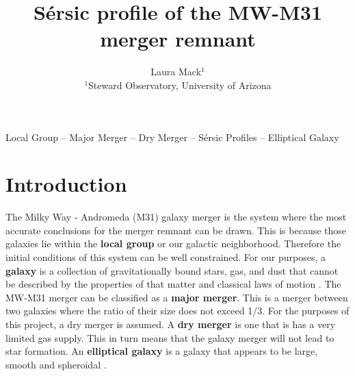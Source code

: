 \documentclass[fleqn,usenatbib]{mnras}
\title[S\'ersic profile of the MW-M31 merger remnant]{S\'ersic profile of the MW-M31 merger remnant}
\author[L. Mack]{
Laura Mack$^{1}$
\\
$^{1}$Steward Observatory, University of Arizona
}
\begin{document}
\label{firstpage}
\pagerange{\pageref{firstpage}--\pageref{lastpage}}
\maketitle


\begin{keywords}
Local Group -- Major Merger -- Dry Merger -- S\'ersic Profiles -- Elliptical Galaxy 
\end{keywords}



\section{Introduction}
The Milky Way - Andromeda (M31) galaxy merger is the system where the most accurate conclusions for the merger remnant can be drawn. This is because those galaxies lie within the \textbf{local group} or our galactic neighborhood. Therefore the initial conditions of this system can be well constrained.
For our purposes, a \textbf{galaxy} is a collection of gravitationally bound stars, gas, and dust that cannot be described by the properties of that matter and classical laws of motion \citep{Willman2012}.
The MW-M31 merger can be classified as a \textbf{major merger}. This is a merger between two galaxies where the ratio of their size does not exceed 1/3. 
For the purposes of this project, a dry merger is assumed. A \textbf{dry merger} is one that is has a very limited gas supply. This in turn means that the galaxy merger will not lead to star formation. 
An \textbf{elliptical galaxy} is a galaxy that appears to be large, smooth and spheroidal \citep{Masters2012}. 
\end{document}

